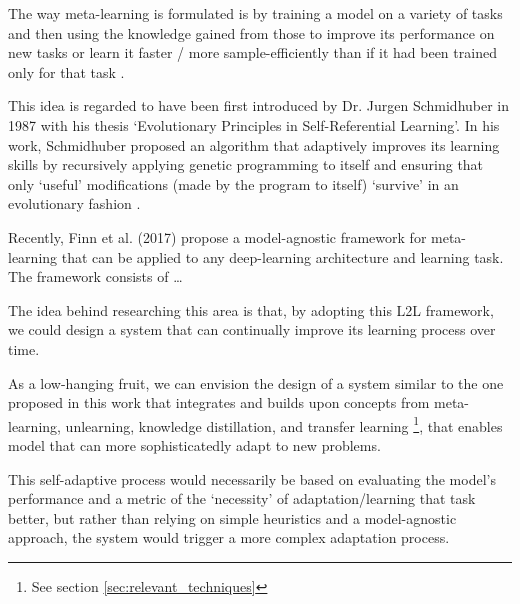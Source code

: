 \documentclass[../main.tex]{subfiles}
\begin{document}
    The way meta-learning is formulated is by training a model on a variety of tasks and then using the knowledge gained from those to improve its performance on new tasks or learn it faster / more sample-efficiently than if it had been trained only for that task \cite{hospedales_meta-learning_2020}.
    
    This idea is regarded to have been first introduced by Dr. Jurgen Schmidhuber in 1987 with his thesis `Evolutionary Principles in Self-Referential Learning'. In his work, Schmidhuber proposed an algorithm that adaptively improves its learning skills by recursively applying genetic programming to itself and ensuring that only `useful' modifications (made by the program to itself) `survive' in an evolutionary fashion \cite{schmidhuber_evolutionary_1987}.
    
    Recently, Finn et al. (2017) \cite{finn_model-agnostic_2017} propose a model-agnostic framework for meta-learning that can be applied to any deep-learning architecture and learning task. The framework consists of \dots

    The idea behind researching this area is that, by adopting this L2L framework, we could design a system that can continually improve its learning process over time.

    As a low-hanging fruit, we can envision the design of a system similar to the one proposed in this work that integrates and builds upon concepts from meta-learning, unlearning, knowledge distillation, and transfer learning \footnote{See section \ref{sec:relevant_techniques}}, that enables model that can more sophisticatedly adapt to new problems. 
    
    This self-adaptive process would necessarily be based on evaluating the model's performance and a metric of the `necessity' of adaptation/learning that task better, but rather than relying on simple heuristics and a model-agnostic approach, the system would trigger a more complex adaptation process.

  

\end{document}
